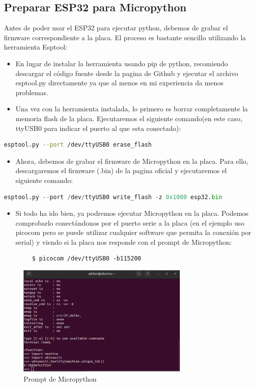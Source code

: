 \begin{titlepage}
\subsection{Preparar ESP32 para Micropython}
Antes de poder usar el ESP32 para ejecutar python, debemos de grabar el firmware correspondiente a la placa. El proceso es bastante sencillo utilizando la herramienta Esptool\cite{ref17}:
\begin{itemize}
	\item En lugar de instalar la herramienta usando pip de python, recomiendo descargar el código fuente desde la pagina de Github\cite{ref18} y ejecutar el archivo esptool.py directamente ya que al menos en mi experiencia da menos problemas.
	\item Una vez con la herramienta instalada, lo primero es borrar completamente la memoria flash de la placa. Ejecutaremos el siguiente comando(en este caso, ttyUSB0 para indicar el puerto al que esta conectado):
\end{itemize}
\begin{lstlisting}[language=Bash]
	esptool.py --port /dev/ttyUSB0 erase_flash
\end{lstlisting}
\begin{itemize}
	\item Ahora, debemos de grabar el firmware de Micropython en la placa. Para ello, descargaremos el firmware (.bin) de la pagina oficial\cite{ref19} y ejecutaremos el siguiente comando:
\end{itemize}
\begin{lstlisting}[language=python]
	esptool.py --port /dev/ttyUSB0 write_flash -z 0x1000 esp32.bin
\end{lstlisting}
\begin{itemize}
	\item Si todo ha ido bien, ya podremos ejecutar Micropython en la placa. Podemos comprobarlo conectándonos por el puerto serie a la placa (en el ejemplo uso picocom pero se puede utilizar cualquier software que permita la conexión por serial) y viendo si la placa nos responde con el prompt de Micropython:
\end{itemize}
	\begin{lstlisting}
		$ picocom /dev/ttyUSB0 -b115200
	\end{lstlisting}
	\begin{figure}[h!]
		\centering
		\includegraphics[width=0.75\textwidth]{imagenes/micropython_prompt.png}
		\caption{Prompt de Micropython}
	\end{figure}


\end{titlepage}
